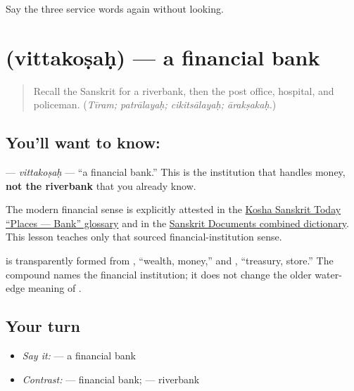 \begin{tcolorbox}[breakable,colback=teal!4,colframe=teal!35!black,title={Before you move on}]
Say the three service words again without looking.
\end{tcolorbox}
\section[\texorpdfstring{\sk{वित्तकोषः} (vittakoṣaḥ)}{वित्तकोषः (vittakoṣaḥ)}]{ (vittakoṣaḥ) — a financial bank}

\label{lesson:SA-C268-vittakosah}



\begin{quote}
Recall the Sanskrit for a riverbank, then the post office, hospital, and policeman. (\emph{Tīram; patrālayaḥ; cikitsālayaḥ; ārakṣakaḥ.})
\end{quote}

\subsection*{You'll want to know: }
\textbf{} — \emph{vittakoṣaḥ} — “a financial bank.” This is the institution that handles money, \textbf{not the riverbank} \textbf{} that you already know.

The modern financial sense is explicitly attested in the \href{https://kosha.sanskrit.today/glossary/places-bank}{Kosha Sanskrit Today “Places — Bank” glossary} and in the \href{https://sanskritdocuments.org/dict/dictallcheck.pdf}{Sanskrit Documents combined dictionary}. This lesson teaches only that sourced financial-institution sense.

\begin{cousinweb}
\textbf{} is transparently formed from \textbf{}, “wealth, money,” and \textbf{}, “treasury, store.” The compound names the financial institution; it does not change the older water-edge meaning of \textbf{}.
\end{cousinweb}

\subsection*{Your turn}
\begin{itemize}
\raggedright
  \item \emph{Say it:} \textbf{} — a financial bank
  \item \emph{Contrast:} \textbf{} — financial bank; \textbf{} — riverbank
\end{itemize}

